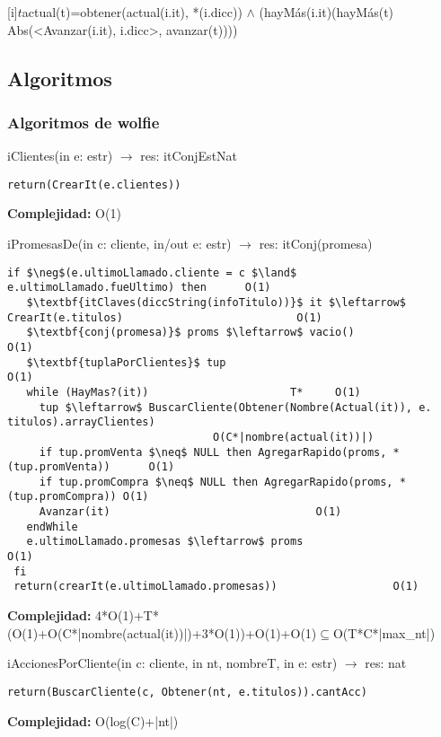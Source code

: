 
 [i]{$t$}{actual(t)=obtener(actual(i.it), *(i.dicc)) $\land$ (hayM\'as(i.it)\impluego (hayM\'as(t) \yluego Abs(<Avanzar(i.it), i.dicc>, avanzar(t))))}


\subsection{Algoritmos}
\lstset { %
    showstringspaces=false,
}
\subsubsection{Algoritmos de wolfie}
iClientes(in e: estr) $\rightarrow$ res: itConjEstNat
\begin{lstlisting}[mathescape]
  return(CrearIt(e.clientes))
\end{lstlisting}
\textbf{Complejidad:} O(1)

iPromesasDe(in c: cliente, in/out e: estr) $\rightarrow$ res: itConj(promesa)
\begin{lstlisting}[mathescape]
 if $\neg$(e.ultimoLlamado.cliente = c $\land$ e.ultimoLlamado.fueUltimo) then		O(1)
   $\textbf{itClaves(diccString(infoTitulo))}$ it $\leftarrow$ CrearIt(e.titulos)							O(1)
   $\textbf{conj(promesa)}$ proms $\leftarrow$ vacio() 								O(1)
   $\textbf{tuplaPorClientes}$ tup										O(1)
   while (HayMas?(it))						T*	   O(1)
     tup $\leftarrow$ BuscarCliente(Obtener(Nombre(Actual(it)), e. titulos).arrayClientes)	
     							O(C*|nombre(actual(it))|)
     if tup.promVenta $\neq$ NULL then AgregarRapido(proms, *(tup.promVenta))	   O(1)
     if tup.promCompra $\neq$ NULL then AgregarRapido(proms, *(tup.promCompra)) O(1)
     Avanzar(it)								O(1)
   endWhile
   e.ultimoLlamado.promesas $\leftarrow$ proms						O(1)
 fi
 return(crearIt(e.ultimoLlamado.promesas))					O(1)
\end{lstlisting}
\textbf{Complejidad:} 4*O(1)+T*(O(1)+O(C*|nombre(actual(it))|)+3*O(1))+O(1)+O(1)$\subseteq$O(T*C*|max\_nt|)

iAccionesPorCliente(in c: cliente, in nt, nombreT, in e: estr) $\rightarrow$ res: nat
\begin{lstlisting}[mathescape]
  return(BuscarCliente(c, Obtener(nt, e.titulos)).cantAcc)
\end{lstlisting}
\textbf{Complejidad:} O(log(C)+|nt|)

